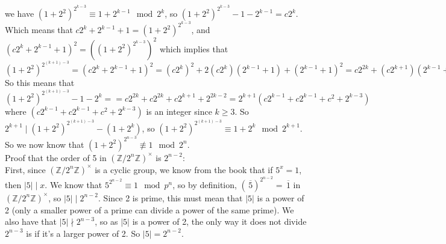 \documentclass{article}
\newcommand{\Z}{\mathbb{Z}}
\newcommand{\olsi}[1]{\,\overline{\!{#1}}}
\begin{document}
    we have $(1 + 2^2)^{2^{k - 3}} \equiv 1 + 2^{k-1} \mod 2^k$,
    so $(1 + 2^2)^{2^{k - 3}} - 1 - 2^{k-1} = c2^k$.
    Which means that $c2^k + 2^{k-1} + 1 = (1 + 2^2)^{2^{k - 3}}$,
    and $(c2^k + 2^{k-1} + 1)^2 = ((1 + 2^2)^{2^{k - 3}})^2$
    which implies that $(1 + 2^2)^{2^{(k+1) - 3}}
    = (c2^k + 2^{k-1} + 1)^2
    = (c2^k)^2 + 2(c2^k)(2^{k-1} + 1) + (2^{k-1} + 1)^2
    = c2^{2k} + (c2^{k+1})(2^{k-1} + 1) + (2^{k-1})^2 + 2(2^{k-1}) + 1^2
    = c2^{2k} + c2^{2k} + c2^{k+1} + 2^{2k-2} + 2^{k} + 1$ \\
    So this means that 
    $(1 + 2^2)^{2^{(k+1) - 3}} - 1 - 2^{k} = 
    = c2^{2k} + c2^{2k} + c2^{k+1} + 2^{2k-2}
    = 2^{k+1}(c2^{k - 1} + c2^{k-1} + c^2 + 2^{k-3})$
    where $(c2^{k - 1} + c2^{k-1} + c^2 + 2^{k-3})$ is an integer
    since $k \geqslant 3$.
    So $2^{k+1} \mid (1 + 2^2)^{2^{(k+1) - 3}} - (1 + 2^{k})$,
    so $(1 + 2^2)^{2^{(k+1) - 3}} \equiv 1 + 2^{k} \mod 2^{k+1}$.
    So we now know that $(1 + 2^2)^{2^{n-3}} \not\equiv 1 \mod 2^n$. \\ 
    Proof that the order of 5
    in $(\Z/2^n\Z)^\times$ is $2^{n-2}$: \\
    First, since $(\Z/2^n\Z)^\times$ is a cyclic group,
    we know from the book that if $5^x = 1$,
    then $|5| \mid x$.
    We know that $5^{2^{n-2}} \equiv 1 \mod p^n$,
    so by definition, $(\olsi{5})^{2^{n-2}} = \olsi{1}$
    in $(\Z/2^n\Z)^\times$,
    so $|5| \mid 2^{n-2}$.
    Since 2 is prime, this must mean that $|5|$ is a power of 2
    (only a smaller power of a prime can divide a power of the same prime).
    We also have that $|5| \nmid 2^{n-3}$,
    so as $|5|$ is a power of 2,
    the only way it does not divide $2^{n-3}$ is if it's
    a larger power of 2.
    So $|5| = 2^{n-2}$.
\end{document}
